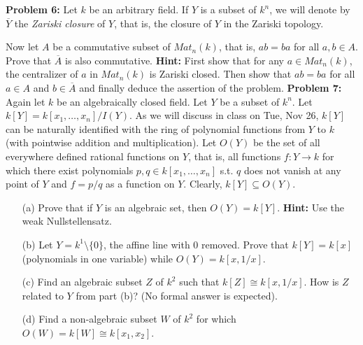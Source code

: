 \documentclass[12pt]{article}
\begin{document}
\skv
{\bf Problem 6:} Let $k$ be an arbitrary field. If $Y$ is a subset of $k^n$, we will
denote by $\overline Y$ the {\it Zariski closure} of $Y$, that is, the closure of $Y$ in the 
Zariski topology. 

\sk Now let $A$ be a commutative subset of $Mat_n(k)$, that is, $ab=ba$ for all $a,b\in A$.
Prove that $\overline A$ is also commutative. {\bf Hint:} First show that for any $a\in Mat_n(k)$,
the centralizer of $a$ in $Mat_n(k)$ is Zariski closed. Then show that $ab=ba$ for all $a\in A$
and $b\in \overline A$ and finally deduce the assertion of the problem.
\skv
{\bf Problem 7:} Again let $k$ be an algebraically closed field.
Let $Y$ be a subset of $k^n$. Let 
$k[Y]=k[x_1,\ldots, x_n]/I(Y)$. As we will discuss in class on Tue, Nov 26, $k[Y]$ can be naturally identified with the ring of polynomial functions from $Y$ to $k$ (with pointwise addition and multiplication). Let $O(Y)$
be the set of all everywhere defined rational functions on $Y$, that is,
all functions $f:Y\to k$ for which there exist polynomials $p,q\in k[x_1,\ldots, x_n]$
s.t. $q$ does not vanish at any point of $Y$ and $f=p/q$ as a function on $Y$. Clearly,
$k[Y]\subseteq O(Y)$.
\begin{itemize}
\item[(a)] Prove that if $Y$ is an algebraic set, then $O(Y)=k[Y]$. {\bf Hint:} Use the weak
Nullstellensatz.
\item[(b)] Let $Y=k^1\setminus\{0\}$, the affine line with $0$ removed. Prove that
$k[Y]=k[x]$ (polynomials in one variable) while $O(Y)=k[x,1/x]$.
\item[(c)] Find an algebraic subset $Z$ of $k^2$ such that $k[Z]\cong k[x,1/x]$.
How is $Z$ related to $Y$ from part (b)? (No formal answer is expected).
\item[(d)] Find a non-algebraic subset $W$ of $k^2$ for which $O(W)=k[W]\cong k[x_1,x_2]$.
\end{itemize}
\end{document}
